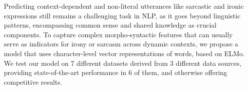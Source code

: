 Predicting context-dependent and non-literal utterances like sarcastic and ironic expressions still remains a challenging task in NLP, as it goes beyond linguistic patterns, encompassing common sense and shared knowledge as crucial components. To capture complex morpho-syntactic features that can usually serve as indicators for irony or sarcasm across dynamic contexts, we propose a model that uses character-level vector representations of words, based on ELMo. We test our model on 7 different datasets derived from 3 different data sources, providing state-of-the-art performance in 6 of them, and otherwise offering competitive results.
